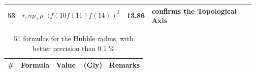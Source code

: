 \documentclass[a4paper,9pt]{article}
\begin{document}
\begin{appendix}
\begin{table}
\begin{tabular}{llll}
    
    53 & $ r_e  n p_+ p_- (f(10 f(11) f(14))^3   $   & 13.86 & confirms the Topological Axis  \\ 
    
  
    
    
    \bottomrule
  \end{tabular}
\end{table}



\begin{table}
\caption{51 formulas for the Hubble radius, with better precision than 0.1 \%}
\label{tab:5:table5}
  \hskip-2.0cm\begin{tabular}{llll}
    \toprule
    \cmidrule(r){1-4}
   \#     & Formula     & Value~~(Gly) & Remarks \\
    \midrule
    

\end{tabular}
\end{table}
\end{appendix}
\end{document}
